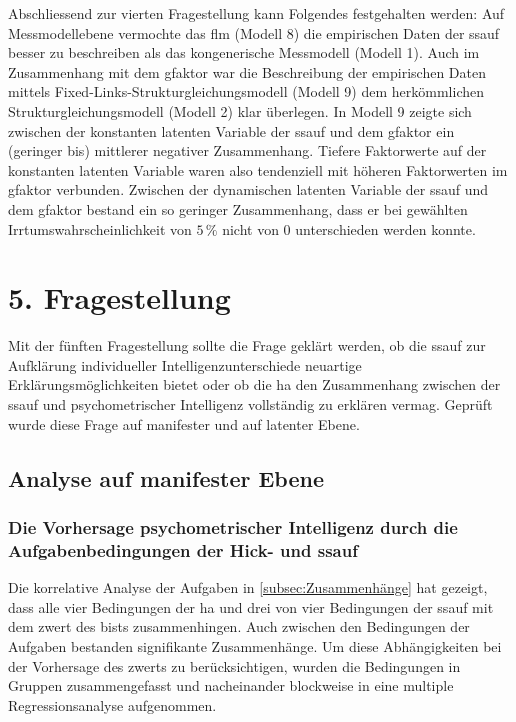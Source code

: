 \documentclass[11pt, twoside, a4paper]{book}		%
\begin{document}
Abschliessend zur vierten Fragestellung kann Folgendes festgehalten werden: Auf Messmodellebene vermochte das \gls{flm} (Modell 8) die empirischen Daten der \gls{ssauf} besser zu beschreiben als das kongenerische Messmodell (Modell 1). Auch im Zusammenhang mit dem \gls{gfaktor} war die Beschreibung der empirischen Daten mittels Fixed-Links-Strukturgleichungsmodell (Modell 9) dem herkömmlichen Strukturgleichungsmodell (Modell 2) klar überlegen. 
In Modell 9 zeigte sich zwischen der konstanten latenten Variable der \gls{ssauf} und dem \gls{gfaktor} ein (geringer bis) mittlerer negativer Zusammenhang. Tiefere Faktorwerte auf der konstanten latenten Variable waren also tendenziell mit höheren Faktorwerten im \gls{gfaktor} verbunden.
Zwischen der dynamischen latenten Variable der \gls{ssauf} und dem \gls{gfaktor} bestand ein so geringer Zusammenhang, dass er bei gewählten Irrtumswahrscheinlichkeit von $5\,\%$ nicht von 0 unterschieden werden konnte. 














\section{5. Fragestellung}

Mit der fünften Fragestellung sollte die Frage geklärt werden, ob die \gls{ssauf} zur Aufklärung individueller Intelligenzunterschiede neuartige Erklärungsmöglichkeiten bietet oder ob die \gls{ha} den Zusammenhang zwischen der \gls{ssauf} und psychometrischer Intelligenz vollständig zu erklären vermag. Geprüft wurde diese Frage auf manifester und auf latenter Ebene.

\subsection{Analyse auf manifester Ebene}

\subsubsection*{Die Vorhersage psychometrischer Intelligenz durch die Aufgabenbedingungen der Hick- und \gls{ssauf}}

Die korrelative Analyse der Aufgaben in \autoref{subsec:Zusammenhänge}  hat gezeigt, dass alle vier Bedingungen der \gls{ha} und drei von vier Bedingungen der \gls{ssauf} mit dem \gls{zwert} des \gls{bist}s zusammenhingen. Auch zwischen den Bedingungen der Aufgaben bestanden signifikante Zusammenhänge. 
Um diese Abhängigkeiten bei der Vorhersage des \gls{zwert}s zu berücksichtigen, wurden die Bedingungen in Gruppen zusammengefasst und nacheinander blockweise in eine multiple Regressionsanalyse aufgenommen.
\end{document}
